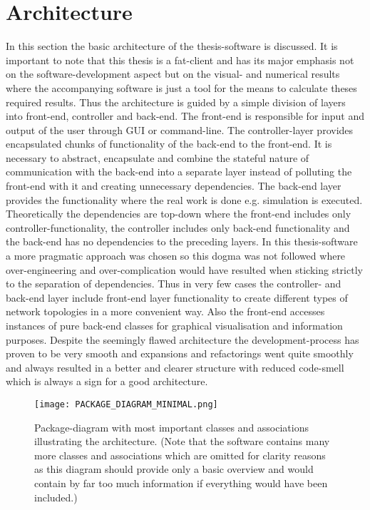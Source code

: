 \documentclass[Bachelorarbeit.tex]{subfiles}
\begin{document}
\section{Architecture}
In this section the basic architecture of the thesis-software is discussed. It is important to note that this thesis is a fat-client and has its major emphasis not on the software-development aspect but on the visual- and numerical results where the accompanying software is just a tool for the means to calculate theses required results. Thus the architecture is guided by a simple division of layers into front-end, controller and back-end. The front-end is responsible for input and output of the user through GUI or command-line. The controller-layer provides encapsulated chunks of functionality of the back-end to the front-end. It is necessary to abstract, encapsulate and combine the stateful nature of communication with the back-end into a separate layer instead of polluting the front-end with it and creating unnecessary dependencies. The back-end layer provides the functionality where the real work is done e.g. simulation is executed.
\medskip
Theoretically the dependencies are top-down where the front-end includes only controller-functionality, the controller includes only back-end functionality and the back-end has no dependencies to the preceding layers. In this thesis-software a more pragmatic approach was chosen so this dogma was not followed where over-engineering and over-complication would have resulted when sticking strictly to the separation of dependencies. Thus in very few cases the controller- and back-end layer include front-end layer functionality to create different types of network topologies in a more convenient way. Also the front-end accesses instances of pure back-end classes for graphical visualisation and information purposes. Despite the seemingly flawed architecture the development-process has proven to be very smooth and expansions and refactorings went quite smoothly and always resulted in a better and clearer structure with reduced code-smell which is always a sign for a good architecture.

\begin{figure}[H]
	\centering
  \texttt{[image: PACKAGE\_DIAGRAM\_MINIMAL.png]}
	\caption{Package-diagram with most important classes and associations illustrating the architecture. (Note that the software contains many more classes and associations which are omitted for clarity reasons as this diagram should provide only a basic overview and would contain by far too much information if everything would have been included.)}
	\label{fig:PACKAGE_DIAGRAM_MINIMAL}
\end{figure}
\end{document}
